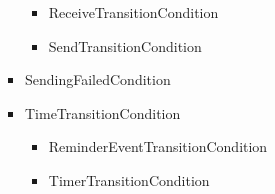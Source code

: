 \begin{itemize}
\begin{itemize}
\begin{itemize}
\begin{itemize}
\begin{itemize}
				\begin{itemize}
					\item ReceiveTransitionCondition
					\item SendTransitionCondition
				\end {itemize}
				\item SendingFailedCondition
				\item TimeTransitionCondition
				\begin{itemize}
					\item ReminderEventTransitionCondition
					\item TimerTransitionCondition
				\end{itemize}
			\end{itemize}
		\end{itemize}
	\end{itemize}		
			

\end{itemize}
\end{itemize}

